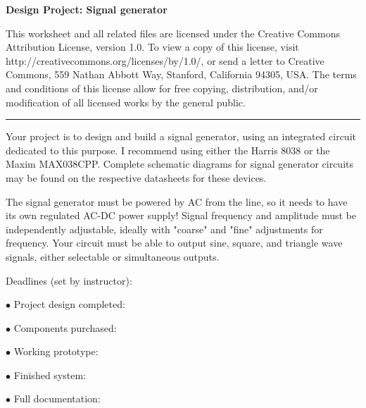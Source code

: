 
\centerline{\bf Design Project: Signal generator} \bigskip 
 
This worksheet and all related files are licensed under the Creative Commons Attribution License, version 1.0.  To view a copy of this license, visit http://creativecommons.org/licenses/by/1.0/, or send a letter to Creative Commons, 559 Nathan Abbott Way, Stanford, California 94305, USA.  The terms and conditions of this license allow for free copying, distribution, and/or modification of all licensed works by the general public.

\bigskip 

\hrule

\vskip 10pt

Your project is to design and build a signal generator, using an integrated circuit dedicated to this purpose.  I recommend using either the Harris 8038 or the Maxim MAX038CPP.  Complete schematic diagrams for signal generator circuits may be found on the respective datasheets for these devices.

The signal generator must be powered by AC from the line, so it needs to have its own regulated AC-DC power supply!  Signal frequency and amplitude must be independently adjustable, ideally with "coarse" and "fine" adjustments for frequency.  Your circuit must be able to output sine, square, and triangle wave signals, either selectable or simultaneous outputs.

\vskip 10pt

\noindent
Deadlines (set by instructor):

\medskip
\item{$\bullet$} Project design completed: 
\item{$\bullet$} Components purchased:
\item{$\bullet$} Working prototype:
\item{$\bullet$} Finished system:
\item{$\bullet$} Full documentation:
\medskip



